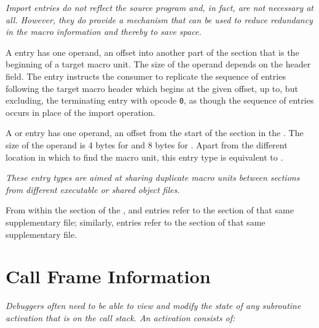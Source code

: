 \textit{Import entries do not reflect the source program
and, in fact, are not necessary at all. However, they do
provide a mechanism that can be used to reduce redundancy
in the macro information and thereby to save space.}

\begin{enumerate}[1. ]
\itembfnl{\DWMACROimportTARG{}}
A \DWMACROimportNAME{} entry has one operand, an offset into
another part of the \dotdebugmacro{} section that is
the beginning of a target macro unit. The size of the operand
depends on the header \HFNoffsetsizeflag{} field.  The
\DWMACROimportNAME{} entry instructs the consumer to
replicate the sequence of entries following the target macro 
header which begins at the given 
\dotdebugmacro{} offset, up to, but excluding,
the terminating entry with opcode \texttt{0},
as though 
\bb
the sequence of entries
\eb
occurs in place of the import operation.

\itembfnl{\bb \DWMACROimportsupfourTARG, \DWMACROimportsupeightTARG}
A \DWMACROimportsupfourNAME{} or \DWMACROimportsupeightNAME{} 
\eb
entry has one operand, an 
offset from the start of the \dotdebugmacro{} section in the 
.  
The size of the operand 
\bb
is 4 bytes for \DWMACROimportsupfourNAME{} and 8 bytes for
\DWMACROimportsupeightNAME{}.
\eb
Apart from the different location in which to find the macro unit,
this entry type is equivalent to \DWMACROimport. 

\textit{
\bb
These entry types are
\eb
aimed at sharing duplicate 
macro units between \dotdebugmacro{}
sections from different executable or shared object files.}  

From within the \dotdebugmacro{} section of the 
, \DWMACROdefinestrp{} 
and \DWMACROundefstrp{} entries refer to the
\dotdebugstr{} section of that same supplementary file;
similarly, \DWMACROimport{} entries refer to the 
\dotdebugmacro{} section of that same supplementary file.

\end{enumerate}


\section{Call Frame Information}
\label{chap:callframeinformation}

\textit{Debuggers often need to be able to view and modify the 
state of any subroutine activation that is
on the call stack. An activation consists of:}

